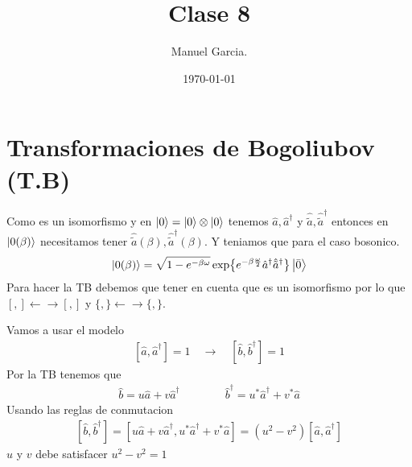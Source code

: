 \documentclass{article}
\title{Clase 8 }
\author{Manuel Garcia.}
\date{\today}
\begin{document}
\maketitle

\section{Transformaciones de Bogoliubov (T.B)}
Como es un isomorfismo y en $ \ket{0 } = \ket{0 } \otimes \ket{0 } $ tenemos $ \hat a , \hat a ^ {\dagger } $ y $ \hat{\tilde a }, \hat{\tilde a } ^ {\dagger } $ entonces en $ \ket{0(\beta)} $ necesitamos tener $  \hat{\tilde a }(\beta), \hat{\tilde a } ^ {\dagger }(\beta)  $. Y teniamos que para el caso bosonico.
\begin{gather*}
  \ket{0 (\beta)} = \sqrt{1 - e ^ {- \beta \omega }}  \exp{e ^ {- \beta \frac{\omega}{2}}\hat a ^ {\dagger } \hat{\tilde a } ^ {\dagger }}\ket{\bar 0} 
\end{gather*}
Para hacer la TB debemos que tener en cuenta que es un isomorfismo por lo que $ [,]\leftarrow \rightarrow [,] $ y $ \{,\}\leftarrow \rightarrow \{,\} $.

Vamos a usar el modelo 
\begin{gather*}
  \left[ \hat a  , \hat a ^ {\dagger }  \right] = 1 \quad \rightarrow \quad \left[ \hat b  , \hat b ^ {\dagger }  \right] = 1 
\end{gather*}
Por la TB tenemos que
\begin{gather*}
  \hat b = u \hat a + v \hat a ^ {\dagger } \qquad \qquad \hat b ^ {\dagger } = u^* \hat a ^ {\dagger } + v^* \hat a 
\end{gather*}
Usando las reglas de conmutacion 
\begin{gather*}
  \left[ \hat b  ,  \hat b ^ {\dagger }  \right] = \left[ u \hat a + v \hat a ^ {\dagger } ,u^* \hat a ^ {\dagger } + v^* \hat a  \right]  = (u^2 - v^2) \left[ \hat a  , \hat a ^ {\dagger }  \right]
\end{gather*}
$ u  $ y $ v  $ debe satisfacer $  u ^2 - v ^2 = 1  $

\hfill 

\hfill 
\end{document}
